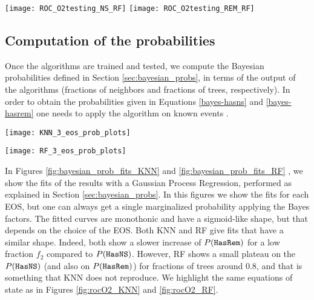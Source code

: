\begin{figure*}[h]
\texttt{[image: ROC\_O2testing\_NS\_RF]}
\texttt{[image: ROC\_O2testing\_REM\_RF]}
\caption{\label{fig:rocO2_RF}ROC curves for the testing dataset for \ac{RF} classfier. All 23 EoS shown in grey, in color the EoSs with minimum and maximum mass, along commonly used SLy. }
\end{figure*}



\subsection{Computation of the probabilities}

Once the algorithms are trained and tested,  we compute the Bayesian probabilities defined in Section \ref{sec:bayesian_probs},  in terms of the output of the algorithms (fractions of neighbors and fractions of trees, respectively).  In order to obtain the probabilities given in Equations \ref{bayes-hasns} and \ref{bayes-hasrem} one needs to apply the algorithm on known events . 

\begin{figure*}[h]
\texttt{[image: KNN\_3\_eos\_prob\_plots]}
\caption{\label{fig:bayesian_prob_fits_KNN} .}
\end{figure*}

\begin{figure*}[h]
\texttt{[image: RF\_3\_eos\_prob\_plots]}
\caption{\label{fig:bayesian_prob_fits_RF} .}
\end{figure*}

In Figures \ref{fig:bayesian_prob_fits_KNN} and \ref{fig:bayesian_prob_fits_RF} , we show the fits of  the results with a Gaussian Process Regression,   performed as explained in Section \ref{sec:bayesian_probs}. In this figures we show the fits for each EOS, but one can always get a single marginalized probability applying the Bayes factors.  The fitted curves are monothonic and have a sigmoid-like shape, but that  depends on the choice of the EOS.  Both \ac{KNN} and \ac{RF} give fits that have a similar shape. Indeed, both show a slower increase of $P({{\tt HasRem}})$ for a low fraction $f_2$ compared to $P({{\tt HasNS}})$. However, \ac{RF} shows a small plateau on the $P({{\tt HasNS}})$ (and also on $P({{\tt HasRem}})$) for fractions of trees around 0.8, and that is  something that \ac{KNN} does not reproduce. We highlight the same equations of state as in Figures \ref{fig:rocO2_KNN} and \ref{fig:rocO2_RF}.

